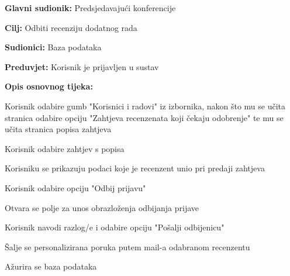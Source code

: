 					\noindent {}
					\begin{packed_item}
	
						\item \textbf{Glavni sudionik: } Predsjedavajući konferencije
						\item  \textbf{Cilj:} Odbiti recenziju dodatnog rada
						\item  \textbf{Sudionici:} Baza podataka
						\item  \textbf{Preduvjet:} Korisnik je prijavljen u sustav
						\item  \textbf{Opis osnovnog tijeka:}
						
						\item[] \begin{packed_enum}
	
							\item Korisnik odabire gumb "Korisnici i radovi" iz izbornika, nakon što mu se učita stranica odabire opciju "Zahtjeva recenzenata koji čekaju odobrenje" te mu se učita stranica popisa zahtjeva
							\item Korisnik odabire zahtjev s popisa
							\item Korisniku se prikazuju podaci koje je recenzent unio pri predaji zahtjeva
							\item Korisnik odabire opciju "Odbij prijavu"
							\item Otvara se polje za unos obrazloženja odbijanja prijave
							\item Korisnik navodi razlog/e i odabire opciju "Pošalji odbijenicu"
							\item Šalje se personalizirana poruka putem mail-a odabranom recenzentu
							\item Ažurira se baza podataka

					
						\end{packed_enum}
			
					\end{packed_item}

